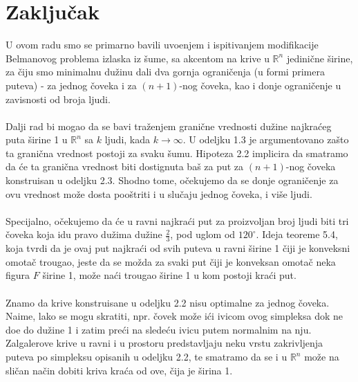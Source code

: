 \documentclass[11pt,letter]{article}
\begin{document}
\section[Zaklju\v cak]{Zaklju\v cak}
\bigskip
U ovom radu smo se primarno bavili uvo\dj enjem i ispitivanjem modifikacije Belmanovog problema izlaska iz \v sume, sa akcentom na krive u $\mathbb{R}^n$ jedini\v cne \v sirine, za \v ciju smo minimalnu du\v zinu dali dva gornja ograni\v cenja (u formi primera puteva) - za jednog \v coveka i za $(n+1)$-nog \v coveka, kao i donje ograni\v cenje u zavisnosti od broja ljudi.
\\
\\
\indent Dalji rad bi mogao da se bavi tra\v zenjem grani\v cne vrednosti du\v zine najkra\' ceg puta \v sirine 1 u $\mathbb{R}^n$ sa $k$ ljudi, kada $k\to \infty$. U odeljku 1.3 je argumentovano za\v sto ta grani\v cna vrednost postoji za svaku \v sumu. Hipoteza 2.2 implicira da smatramo da \' ce ta grani\v cna vrednost biti dostignuta ba\v s za put za $(n+1)$-nog \v coveka konstruisan u odeljku 2.3. Shodno tome, o\v cekujemo da se donje ograni\v cenje za ovu vrednost mo\v ze dosta poo\v striti i u slu\v caju jednog \v coveka, i vi\v se ljudi.
\\
\\
\indent Specijalno, o\v cekujemo da \' ce u ravni najkra\' ci put za proizvoljan broj ljudi biti tri \v coveka koja idu pravo du\v zima du\v zine $\frac{2}{3}$, pod uglom od $120^\circ$. Ideja teoreme 5.4, koja tvrdi da je ovaj put najkra\' ci od svih puteva u ravni \v sirine 1 \v ciji je konveksni omota\v c trougao, jeste da se mo\v zda za svaki put \v ciji je konveksan omota\v c neka figura $F$ \v sirine 1, mo\v ze na\' ci trougao \v sirine 1 u kom postoji kra\' ci put.
\\
\\
\indent Znamo da krive konstruisane u odeljku 2.2 nisu optimalne za jednog \v coveka. Naime, lako se mogu skratiti, npr. \v covek mo\v ze i\' ci ivicom ovog simpleksa dok ne do\dj e do du\v zine 1 i zatim pre\' ci na slede\' cu ivicu putem normalnim na nju. Zalgalerove krive u ravni i u prostoru predstavljaju neku vrstu zakrivljenja puteva po simpleksu opisanih u odeljku 2.2, te smatramo da se i u $\mathbb{R}^n$ mo\v ze na sli\v can na\v cin dobiti kriva kra\' ca od ove, \v cija je \v sirina 1.
\bigskip
\bigskip
\end{document}
